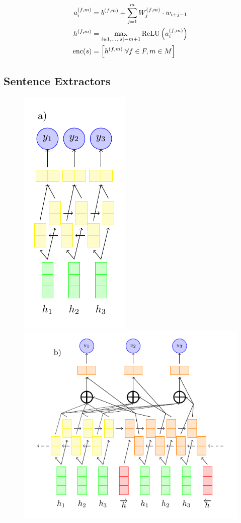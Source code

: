 \begin{align}
 a^{(f,m)}_i &= b^{(f,m)} 
    + \sum^m_{j=1} W^{(f,m)}_j \cdot w_{i + j -1}\\
  h^{(f,m)} &= \max_{i\in 1,\dots, |s| - m + 1} 
                      \operatorname{ReLU}\left(a^{(f,m)}_i\right) \\
                      \operatorname{enc}(s) &= \left[h^{(f,m)}| \forall f \in F, m \in M \right]
\end{align}


\subsection{Sentence Extractors}
\begin{figure}
  \center
  \includegraphics[scale=.7]{figures/rnnextractor.pdf}
  \includegraphics[scale=.7]{figures/s2s_extractor.pdf}

\end{figure}
